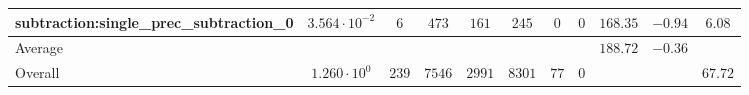 \begin{tabular}{|l|c|c|c|c|c|c|c|c|c|c|}
subtraction:single\_prec\_subtraction\_0         & $ 3.564 \cdot 10^{-2} $ & $ 6      $ & $ 473  $ & $ 161  $ & $ 245   $ & $ 0  $ & $ 0 $ & $ 168.35      $ & $ -0.94   $ & $ 6.08    $ \\
\hline
Average                                          & $                     $ & $        $ & $      $ & $      $ & $       $ & $    $ & $   $ & $ 188.72      $ & $ -0.36   $ & $         $ \\
\hline
Overall                                          & $ 1.260 \cdot 10^{0}  $ & $ 239    $ & $ 7546 $ & $ 2991 $ & $ 8301  $ & $ 77 $ & $ 0 $ & $             $ & $         $ & $ 67.72   $ \\
\hline
\end{tabular}

